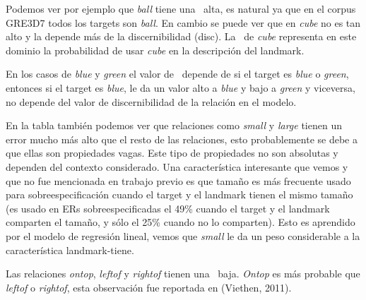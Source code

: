 

Podemos ver por ejemplo que {\it ball} tiene una \puse\ alta, es natural ya que en el corpus GRE3D7 todos los targets son {\it ball}. En cambio se puede ver que en {\it cube} no es tan alto y la \puse depende m\'as de la discernibilidad (disc). La \puse\ de {\it cube} representa en este dominio la probabilidad de usar {\it cube} en la descripci\'on del landmark. 

En los casos de {\it blue} y {\it green} el valor de \puse\ depende de si el target es {\it blue} o {\it green}, entonces si el target es {\it blue}, le da un valor alto a {\it blue} y bajo a {\it green} y viceversa, no depende del valor de discernibilidad de la relaci\'on en el modelo. 

En la tabla tambi\'en podemos ver que relaciones como {\it small} y {\it large} tienen un error mucho m\'as alto que el resto de las relaciones, esto probablemente se debe a que ellas son propiedades vagas. Este tipo de propiedades no son absolutas y dependen del contexto considerado. Una caracter\'istica interesante que vemos y que no fue mencionada en trabajo previo es que tama\~no es m\'as frecuente usado para sobreespecificaci\'on cuando el target y el landmark tienen el mismo tama\~no 
(es usado en ERs sobreespecificadas el 49\% cuando el target y el landmark comparten el tama\~no, y s\'olo el 25\% cuando no lo comparten). Esto es aprendido por el modelo de regresi\'on lineal, vemos que {\it small} le da un peso considerable a la caracter\'istica landmark-tiene.

Las relaciones {\it ontop}, {\it leftof} y {\it rightof} tienen una \puse\ baja. {\it Ontop} es m\'as probable que {\it leftof} o {\it rightof}, esta observaci\'on fue reportada en (Viethen, 2011). 



